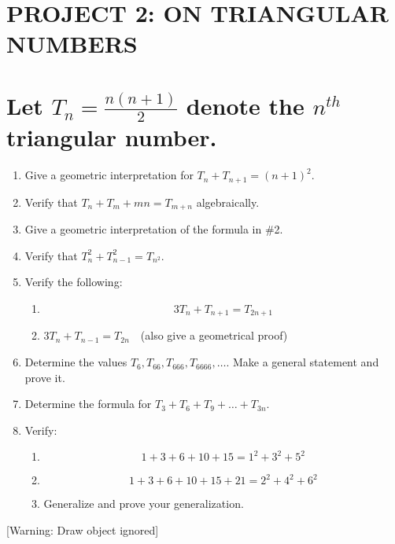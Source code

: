 \documentclass{article}
\begin{document}
\section[PROJECT 2: ON TRIANGULAR NUMBERS]{PROJECT 2: ON TRIANGULAR NUMBERS}
\section[Let  \ denote the  triangular number.]{Let  $T_n=\frac{n\left(n+1\right)} 2$  denote the  $n^{\mathit{th}}$
triangular number.}
\begin{enumerate}
\item Give a geometric interpretation for   $T_n+T_{n+1}=\left(n+1\right)^2.$
\item Verify that   $T_n+T_m+\mathit{mn}=T_{m+n}$ algebraically. 
\item Give a geometric interpretation of the formula in \#2. 
\item Verify that  $T_n^2+T_{n-1}^2=T_{n^2}$.
\item Verify the following:

\begin{enumerate}
\item \begin{equation*}
3T_n+T_{n+1}=T_{2n+1}
\end{equation*}
\item  $3T_n+T_{n-1}=T_{2n}$\ \ (also give a geometrical proof)
\end{enumerate}
\item Determine the values  $T_6,T_{66},T_{666},T_{6666},{\dots}$.  Make a general statement and prove it. 
\item Determine the formula for  $T_3+T_6+T_9+{\dots}+T_{3n}.$
\item Verify:

\begin{enumerate}
\item \begin{equation*}
1+3+6+10+15=1^2+3^2+5^2
\end{equation*}
\item \begin{equation*}
1+3+6+10+15+21=2^2+4^2+6^2
\end{equation*}
\item Generalize and prove your generalization. 
\end{enumerate}
\end{enumerate}
[Warning: Draw object ignored]
\end{document}
